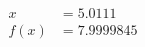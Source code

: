 \documentclass[preview]{standalone}
\begin{document}
\begin{align*}
x &= 5.0111\\f(x) &= 7.9999845
\end{align*}
\end{document}
